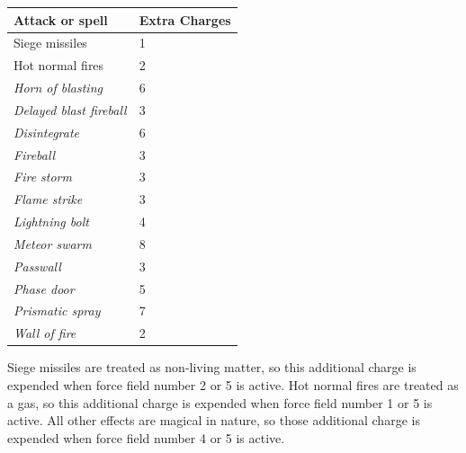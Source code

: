 \begin{multicols}{2}
\noindent \begin{tabular}{|p{}|p{}|}
\hline
Attack or spell	& Extra Charges \\
\hline\hline
Siege missiles	& 1 \\
Hot normal fires	& 2 \\
\rowcolor[gray]{.9}\textit{Horn of blasting}	& 6 \\
\textit{Delayed blast fireball}	& 3 \\
\rowcolor[gray]{.9}\textit{Disintegrate}	& 6 \\
\textit{Fireball}	& 3 \\
\rowcolor[gray]{.9}\textit{Fire storm}	& 3 \\
\textit{Flame strike}	& 3 \\
\rowcolor[gray]{.9}\textit{Lightning bolt}	& 4 \\
\textit{Meteor swarm}	& 8 \\
\rowcolor[gray]{.9}\textit{Passwall}	& 3 \\
\textit{Phase door}	& 5 \\
\rowcolor[gray]{.9}\textit{Prismatic spray}	& 7 \\
\textit{Wall of fire}	& 2 \\
\hline
\end{tabular}

Siege missiles are treated as non-living matter, so this additional charge is expended when force field number 2 or 5 is active.  Hot normal fires are treated as a gas, so this additional charge is expended when force field number 1 or 5 is active.  All other effects are magical in nature, so those additional charge is expended when force field number 4 or 5 is active. 


\end{multicols}
